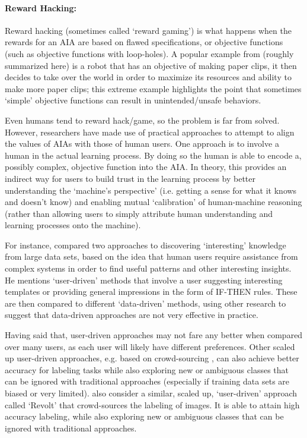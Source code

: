 \paragraph{Reward Hacking:}
Reward hacking (sometimes called `reward gaming') is what happens when the rewards for an AIA are based on flawed specifications, or objective functions (such as objective functions with loop-holes). A popular example from \citet{Bostrom2014-fz} (roughly summarized here) is a robot that has an objective of making paper clips, it then decides to take over the world in order to maximize its resources and ability to make more paper clips; this extreme example highlights the point that sometimes `simple' objective functions can result in unintended/unsafe behaviors.

Even humans tend to reward hack/game, so the problem is far from solved. However, researchers have made use of practical approaches to attempt to align the values of AIAs with those of human users. One approach is to involve a human in the actual learning process. By doing so the human is able to encode a, possibly complex, objective function into the AIA. In theory, this provides an indirect way for users to build trust in the learning process by better understanding the `machine's perspective' (i.e. getting a sense for what it knows and doesn't know) and enabling mutual `calibration' of human-machine reasoning (rather than allowing users to simply attribute human understanding and learning processes onto the machine).

For instance, \citet{Freitas2006-qo} compared two approaches to discovering `interesting' knowledge from large data sets, based on the idea that human users require assistance from complex systems in order to find useful patterns and other interesting insights. He mentions `user-driven' methods that involve a user suggesting interesting templates or providing general impressions in the form of IF-THEN rules. These are then compared to different `data-driven' methods, using other research to suggest that data-driven approaches are not very effective in practice.

Having said that, user-driven approaches may not fare any better when compared over many users, as each user will likely have different preferences. Other scaled up user-driven approaches, e.g. based on crowd-sourcing \citet{Chang2017-kl}, can also achieve better accuracy for labeling tasks while also exploring new or ambiguous classes that can be ignored with traditional approaches (especially if training data sets are biased or very limited). \citet{Chang2017-kl} also consider a similar, scaled up, `user-driven' approach called `Revolt' that crowd-sources the labeling of images. It is able to attain high accuracy labeling, while also exploring new or ambiguous classes that can be ignored with traditional approaches.

